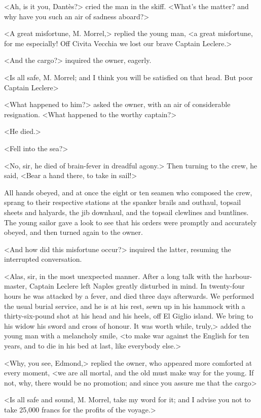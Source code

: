  <Ah, is it you, Dantès?> cried the man in the skiff. <What's the matter? and why have you such an air of sadness aboard?> 

 <A great misfortune, M. Morrel,> replied the young man, <a great misfortune, for me especially! Off Civita Vecchia we lost our brave Captain Leclere.> 

 <And the cargo?> inquired the owner, eagerly. 

 <Is all safe, M. Morrel; and I think you will be satisfied on that head. But poor Captain Leclere\longdash> 

 <What happened to him?> asked the owner, with an air of considerable resignation. <What happened to the worthy captain?> 

 <He died.> 

 <Fell into the sea?> 

 <No, sir, he died of brain-fever in dreadful agony.> Then turning to the crew, he said, <Bear a hand there, to take in sail!> 

 All hands obeyed, and at once the eight or ten seamen who composed the crew, sprang to their respective stations at the spanker brails and outhaul, topsail sheets and halyards, the jib downhaul, and the topsail clewlines and buntlines. The young sailor gave a look to see that his orders were promptly and accurately obeyed, and then turned again to the owner. 

 <And how did this misfortune occur?> inquired the latter, resuming the interrupted conversation. 
 
 <Alas, sir, in the most unexpected manner. After a long talk with the harbour-master, Captain Leclere left Naples greatly disturbed in mind. In twenty-four hours he was attacked by a fever, and died three days afterwards. We performed the usual burial service, and he is at his rest, sewn up in his hammock with a thirty-six-pound shot at his head and his heels, off El Giglio island. We bring to his widow his sword and cross of honour. It was worth while, truly,> added the young man with a melancholy smile, <to make war against the English for ten years, and to die in his bed at last, like everybody else.> 

 <Why, you see, Edmond,> replied the owner, who appeared more comforted at every moment, <we are all mortal, and the old must make way for the young. If not, why, there would be no promotion; and since you assure me that the cargo\longdash> 

 <Is all safe and sound, M. Morrel, take my word for it; and I advise you not to take 25,000 francs for the profits of the voyage.> 

